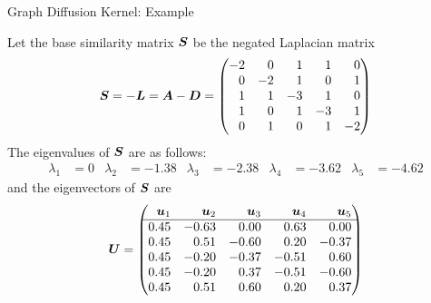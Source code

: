 \begin{frame}{Graph Diffusion Kernel: Example}

  Let the base similarity matrix ${\boldsymbol S}$ be the 
	negated Laplacian matrix
  \begin{align*}
    \bS = -\bL = \bA - \bD = \amatr{r}{
    -2 & 0 & 1 & 1 & 0\\
    0 & -2 & 1 & 0 & 1\\
    1 & 1 & -3 & 1 & 0\\
    1 & 0 & 1 & -3 & 1\\
    0 & 1 & 0 & 1 & -2
    }
  \end{align*}
  The eigenvalues of ${\boldsymbol S}$ are as
  follows:
  \begin{align*}
    \lambda_1 & = 0 & \lambda_2 & = -1.38 & \lambda_3 & = -2.38 &
    \lambda_4 & = -3.62 & \lambda_5 & = -4.62
  \end{align*}
  and the eigenvectors of ${\boldsymbol S}$ are
  \begin{align*}
 \bU = \amatr{r}{
 \bu_1 & \bu_2 & \bu_3 & \bu_4 & \bu_5\\
 \hline
0.45& -0.63&    0.00&   0.63&   0.00\\
0.45&  0.51&   -0.60&   0.20&  -0.37\\
0.45& -0.20&   -0.37&  -0.51&   0.60\\
0.45& -0.20&    0.37&  -0.51&  -0.60\\
0.45&  0.51&    0.60&   0.20&   0.37\\
}
  \end{align*}
\end{frame} 
 

